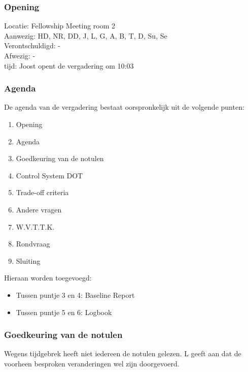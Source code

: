 \subsubsection{Opening}
Locatie: Fellowship Meeting room 2\\
Aanwezig: HD, NR, DD, J, L, G, A, B, T, D, Su, Se\\
Verontschuldigd: - \\
Afwezig: - \\
tijd: Joost opent de vergadering om 10:03\\

\subsubsection{Agenda}
De agenda van de vergadering bestaat oorspronkelijk uit de volgende punten:
\begin{enumerate}
\item Opening
\item Agenda
\item Goedkeuring van de notulen
\item Control System DOT
\item Trade-off criteria
\item Andere vragen
\item W.V.T.T.K.
\item Rondvraag
\item Sluiting
\end{enumerate}

Hieraan worden toegevoegd:
\begin{itemize}
\item Tussen puntje 3 en 4: Baseline Report
\item Tussen puntje 5 en 6: Logbook 
\end{itemize}

\subsubsection{Goedkeuring van de notulen}
Wegens tijdgebrek heeft niet iedereen de notulen gelezen. L geeft aan dat de voorheen besproken veranderingen wel zijn doorgevoerd.\\

